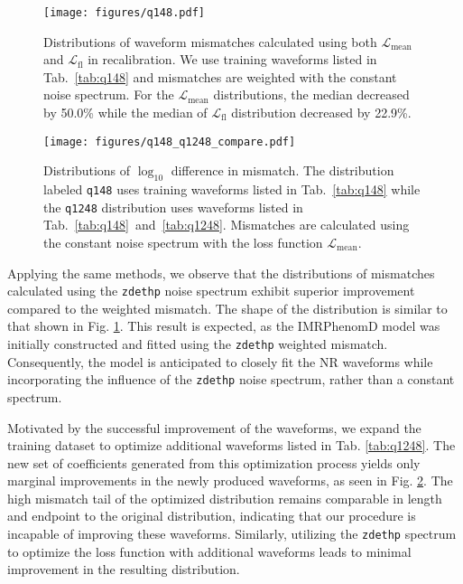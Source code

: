 \documentclass[twocolumn]{aastex631}
\newcommand{\zdethp}{\texttt{zdethp}}
\newcommand{\kw}[1]{{\color{rb4}[KW: #1 ]}}
\begin{document}

\begin{figure}[t]
	\centering
	\texttt{[image: figures/q148.pdf]}
	\caption{Distributions of waveform mismatches calculated using both
	$\mathcal{L}_{\mathrm{mean}}$ and $\mathcal{L}_{\mathrm{fl}}$ in
	recalibration. We use training waveforms listed in Tab.~\ref{tab:q148} and
	mismatches are weighted with the constant noise spectrum. For the
	$\mathcal{L}_{\mathrm{mean}}$ distributions, the median decreased by 50.0\%
	while the median of $\mathcal{L}_{\mathrm{fl}}$ distribution decreased by
	22.9\%.}
	\label{fig:q148}
\end{figure}
\begin{figure}[t]
	\centering
	\texttt{[image: figures/q148\_q1248\_compare.pdf]}
	\caption{Distributions of $\log_{10}$ difference in mismatch. The
	distribution labeled \texttt{q148} uses training waveforms listed in
	Tab.~\ref{tab:q148} while the \texttt{q1248} distribution uses waveforms
	listed in Tab.~\ref{tab:q148}~and~\ref{tab:q1248}. Mismatches are calculated
	using the constant noise spectrum with the loss function
	$\mathcal{L}_{\mathrm{mean}}$.}
	\label{fig:q148_q1248_compare}
\end{figure}

Applying the same methods, we observe that the distributions of mismatches
calculated using the {\zdethp} noise spectrum exhibit superior improvement
compared to the weighted mismatch. The shape of the distribution is similar to
that shown in Fig. \ref{fig:q148}. This result is expected, as the IMRPhenomD
model was initially constructed and fitted using the {\zdethp} weighted
mismatch. Consequently, the model is anticipated to closely fit the NR waveforms
while incorporating the influence of the {\zdethp} noise spectrum, rather than a
constant spectrum.

Motivated by the successful improvement of the waveforms, we expand the training
dataset to optimize additional waveforms listed in Tab. \ref{tab:q1248}. The new
set of coefficients generated from this optimization process yields only
marginal improvements in the newly produced waveforms, as seen in Fig.
\ref{fig:q148_q1248_compare}. The high mismatch tail of the optimized
distribution remains comparable in length and endpoint to the original
distribution, indicating that our procedure is incapable of improving these
waveforms. Similarly, utilizing the {\zdethp} spectrum to optimize the loss
function with additional waveforms leads to minimal improvement in the resulting
distribution.
\end{document}
